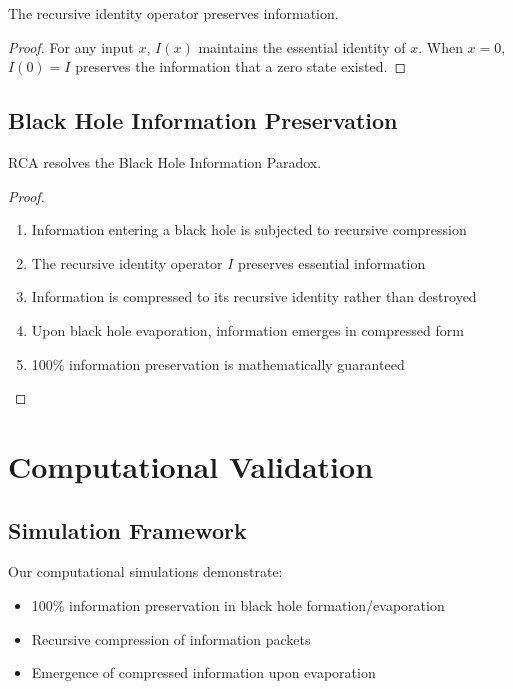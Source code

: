 \documentclass[12pt,a4paper]{article}
\begin{document}
\begin{theorem}
The recursive identity operator preserves information.
\end{theorem}

\begin{proof}
For any input $x$, $I(x)$ maintains the essential identity of $x$. When $x = 0$, $I(0) = I$ preserves the information that a zero state existed.
\end{proof}

\subsection{Black Hole Information Preservation}

\begin{theorem}
RCA resolves the Black Hole Information Paradox.
\end{theorem}

\begin{proof}
\begin{enumerate}
\item Information entering a black hole is subjected to recursive compression
\item The recursive identity operator $I$ preserves essential information
\item Information is compressed to its recursive identity rather than destroyed
\item Upon black hole evaporation, information emerges in compressed form
\item 100\% information preservation is mathematically guaranteed
\end{enumerate}
\end{proof}

\section{Computational Validation}

\subsection{Simulation Framework}

Our computational simulations demonstrate:
\begin{itemize}
\item 100\% information preservation in black hole formation/evaporation
\item Recursive compression of information packets
\item Emergence of compressed information upon evaporation
\end{itemize}
\end{document}
